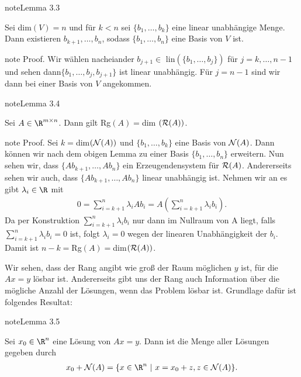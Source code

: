 \documentclass[letterpaper,10pt,english]{jupyterBook}
\begin{document}
\label{vektorraeume/LGS:lemma-1}
\begin{sphinxadmonition}{note}{Lemma 3.3}



Sei dim\((V)=n\) und für \(k < n\) sei \(\{b_1,\ldots,b_k\}\) eine linear unabhängige Menge. Dann existieren \(b_{k+1}, \ldots, b_n\), sodass \(\{b_1,\ldots,b_n\}\) eine Basis von \(V\) ist.
\end{sphinxadmonition}

\begin{sphinxadmonition}{note}
Proof.  Wir wählen nacheiander \(b_{j+1} \in \) lin\((\{b_1,\ldots,b_j\})\) für \(j=k,\ldots,n-1\) und sehen dann\( \{b_1,\ldots,b_j,b_{j+1} \}\) ist linear unabhängig. Für \(j=n-1\) sind wir dann bei einer Basis von \(V\) angekommen.
\end{sphinxadmonition}
\label{vektorraeume/LGS:lemma-2}
\begin{sphinxadmonition}{note}{Lemma 3.4}



Sei \(A \in \R^{m \times n}\). Dann gilt Rg\((A)=\)dim \(({\cal R}(A))\).
\end{sphinxadmonition}

\begin{sphinxadmonition}{note}
Proof.  Sei \(k=\)dim\(({\cal N}(A))\) und \(\{b_1,\ldots,b_k\}\) eine Basis von \({\cal N}(A)\). Dann können wir nach dem obigen Lemma zu einer Basis \(\{b_1,\ldots,b_n\}\) erweitern. Nun sehen wir, dass \(\{Ab_{k+1},\ldots,Ab_n\}\) ein Erzeugendensystem für \({\cal R}(A)\). Andererseits sehen wir auch, dass \(\{Ab_{k+1},\ldots,Ab_n\}\) linear unabhängig ist. Nehmen wir an es gibt \(\lambda_i \in \R\) mit
\begin{equation*}
\begin{split} 0 = \sum_{i=k+1}^n \lambda_i A b_i = A(\sum_{i=k+1}^n \lambda_i b_i).\end{split}
\end{equation*}
Da per Konstruktion \(\sum_{i=k+1}^n \lambda_i b_i\) nur dann im Nullraum von A liegt, falls \(\sum_{i=k+1}^n \lambda_i b_i = 0\) ist, folgt \(\lambda_i=0\)  wegen der linearen Unabhängigkeit der \(b_i\).
Damit ist \(n-k=\)Rg\((A)=\)dim\(({\cal R}(A))\).
\end{sphinxadmonition}

Wir sehen, dass der Rang angibt wie groß der Raum möglichen \(y\) ist, für die \(Ax = y\) lösbar ist. Andererseits gibt uns der Rang auch Information über die mögliche Anzahl der Lösungen, wenn das Problem lösbar ist. Grundlage dafür ist folgendes Resultat:
\label{vektorraeume/LGS:lemma-3}
\begin{sphinxadmonition}{note}{Lemma 3.5}



Sei \(x_0 \in \R^n\) eine Lösung von \(A x = y\). Dann ist die Menge aller Lösungen gegeben durch
\begin{equation*}
\begin{split} x_0 + {\cal N}(A) = \{ x \in \R^n ~|~x=x_0+z, z \in {\cal N}(A)\}.\end{split}
\end{equation*}\end{sphinxadmonition}
\end{document}
